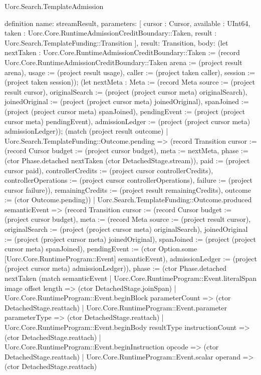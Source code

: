 \begin{lexlean}{Uorc.Search.TemplateAdmission}
\begin{semanticmodule}
definition{
  name: streamResult,
  parameters: [
    cursor : Cursor,
    available : UInt64,
    taken : Uorc.Core.RuntimeAdmissionCreditBoundary::Taken,
    result : Uorc.Search.TemplateFunding::Transition
  ],
  result: Transition,
  body: (let nextTaken : Uorc.Core.RuntimeAdmissionCreditBoundary::Taken := (record Uorc.Core.RuntimeAdmissionCreditBoundary::Taken {arena := (project result arena), usage := (project result usage), caller := (project taken caller), session := (project taken session)}); (let nextMeta : Meta := (record Meta {source := (project result cursor), originalSearch := (project (project cursor meta) originalSearch), joinedOriginal := (project (project cursor meta) joinedOriginal), spanJoined := (project (project cursor meta) spanJoined), pendingEvent := (project (project cursor meta) pendingEvent), admissionLedger := (project (project cursor meta) admissionLedger)}); (match (project result outcome)
    | Uorc.Search.TemplateFunding::Outcome.pending => (record Transition {cursor := (record Cursor {budget := (project cursor budget), meta := nextMeta, phase := (ctor Phase.detached nextTaken (ctor DetachedStage.stream)), paid := (project cursor paid), controllerCredits := (project cursor controllerCredits), controllerOperations := (project cursor controllerOperations), failure := (project cursor failure)}), remainingCredits := (project result remainingCredits), outcome := (ctor Outcome.pending)})
    | Uorc.Search.TemplateFunding::Outcome.produced semanticEvent => (record Transition {cursor := (record Cursor {budget := (project cursor budget), meta := (record Meta {source := (project result cursor), originalSearch := (project (project cursor meta) originalSearch), joinedOriginal := (project (project cursor meta) joinedOriginal), spanJoined := (project (project cursor meta) spanJoined), pendingEvent := (ctor Option.some [Uorc.Core.RuntimeProgram::Event] semanticEvent), admissionLedger := (project (project cursor meta) admissionLedger)}), phase := (ctor Phase.detached nextTaken (match semanticEvent
      | Uorc.Core.RuntimeProgram::Event.literalSpan image offset length => (ctor DetachedStage.joinSpan)
      | Uorc.Core.RuntimeProgram::Event.beginBlock parameterCount => (ctor DetachedStage.reattach)
      | Uorc.Core.RuntimeProgram::Event.parameter parameterType => (ctor DetachedStage.reattach)
      | Uorc.Core.RuntimeProgram::Event.beginBody resultType instructionCount => (ctor DetachedStage.reattach)
      | Uorc.Core.RuntimeProgram::Event.beginInstruction opcode => (ctor DetachedStage.reattach)
      | Uorc.Core.RuntimeProgram::Event.scalar operand => (ctor DetachedStage.reattach)
}}}
\end{semanticmodule}
\end{lexlean}
